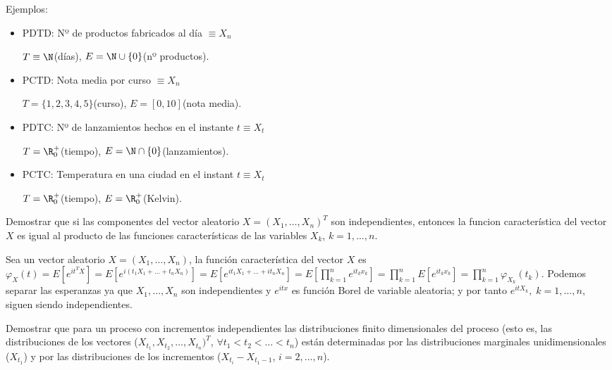 \begin{sol}
  Ejemplos:

  \begin{itemize}
    \item PDTD: Nº de productos fabricados al día $\equiv X_n$

    $T \equiv \N$(días), $E = \N \cup \{0\}$(nº productos).
    \item PCTD: Nota media por curso $\equiv X_n$

    $T = \{1,2,3,4,5\}$(curso), $E = [0, 10]$(nota media).
    \item PDTC: Nº de lanzamientos hechos en el instante $t \equiv X_t$

    $T = \R^+_0$(tiempo), $E = \N \cap \{0\}$(lanzamientos).
    \item PCTC: Temperatura en una ciudad en el instant $t \equiv X_t$

    $T = \R^+_0$(tiempo), $E = \R^+_0$(Kelvin).
  \end{itemize}
\end{sol}

\begin{ejer}
  Demostrar que si las componentes del vector aleatorio $X = (X_1, \ldots, X_n)^T$ son independientes, entonces la funcion característica del vector $X$ es igual al producto de las funciones características de las variables $X_k$, $k = 1, \ldots, n$.
\end{ejer}

\begin{sol}
  Sea un vector aleatorio $X = (X_1, \ldots, X_n)$, la función característica del vector $X$ es $\varphi_X(t) = E[e^{it^TX}] = E[e^{i(t_1 X_1 + \ldots + t_n X_n)}] = E[e^{i t_1 X_1 + \ldots + i t_n X_n}] = E[\prod \limits^n_{k = 1} e^{i t_k x_k}] = \prod \limits^n_{k = 1} E[e^{i t_k x_k}] = \prod \limits^n_{k = 1} \varphi_{X_k} (t_k)$. Podemos separar las esperanzas ya que $X_1, \ldots, X_n$ son independientes y $e^{itx}$ es función Borel de variable aleatoria; y por tanto $e^{itX_k}, \; k = 1, \ldots, n$, siguen siendo independientes.
\end{sol}

\begin{ejer}
  Demostrar que para un proceso con incrementos independientes las distribuciones finito dimensionales del proceso (esto es, las distribuciones de los vectores ($X_{t_1}, X_{t_2}, \ldots, X_{t_n})^T$, $\forall t_1 < t_2 < \ldots < t_n$) están determinadas por las distribuciones marginales unidimensionales ($X_{t_1}$) y por las distribuciones de los incrementos ($X_{t_i} - X_{t_1 - 1}$, $i = 2, \ldots, n$).
\end{ejer}

